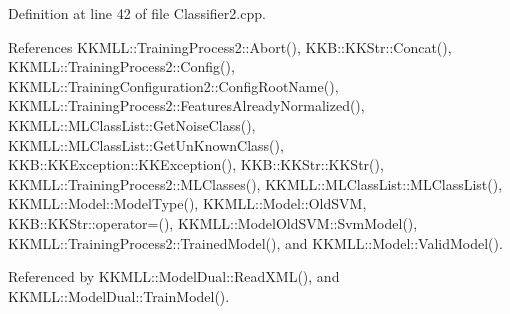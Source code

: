 Definition at line 42 of file Classifier2.\+cpp.



References K\+K\+M\+L\+L\+::\+Training\+Process2\+::\+Abort(), K\+K\+B\+::\+K\+K\+Str\+::\+Concat(), K\+K\+M\+L\+L\+::\+Training\+Process2\+::\+Config(), K\+K\+M\+L\+L\+::\+Training\+Configuration2\+::\+Config\+Root\+Name(), K\+K\+M\+L\+L\+::\+Training\+Process2\+::\+Features\+Already\+Normalized(), K\+K\+M\+L\+L\+::\+M\+L\+Class\+List\+::\+Get\+Noise\+Class(), K\+K\+M\+L\+L\+::\+M\+L\+Class\+List\+::\+Get\+Un\+Known\+Class(), K\+K\+B\+::\+K\+K\+Exception\+::\+K\+K\+Exception(), K\+K\+B\+::\+K\+K\+Str\+::\+K\+K\+Str(), K\+K\+M\+L\+L\+::\+Training\+Process2\+::\+M\+L\+Classes(), K\+K\+M\+L\+L\+::\+M\+L\+Class\+List\+::\+M\+L\+Class\+List(), K\+K\+M\+L\+L\+::\+Model\+::\+Model\+Type(), K\+K\+M\+L\+L\+::\+Model\+::\+Old\+S\+VM, K\+K\+B\+::\+K\+K\+Str\+::operator=(), K\+K\+M\+L\+L\+::\+Model\+Old\+S\+V\+M\+::\+Svm\+Model(), K\+K\+M\+L\+L\+::\+Training\+Process2\+::\+Trained\+Model(), and K\+K\+M\+L\+L\+::\+Model\+::\+Valid\+Model().



Referenced by K\+K\+M\+L\+L\+::\+Model\+Dual\+::\+Read\+X\+M\+L(), and K\+K\+M\+L\+L\+::\+Model\+Dual\+::\+Train\+Model().


